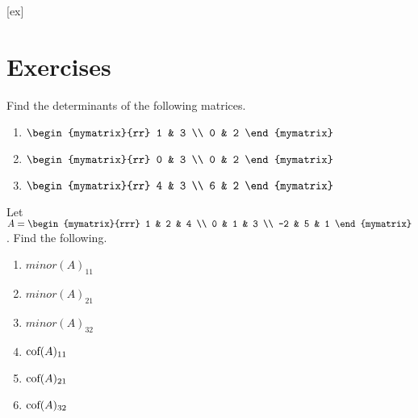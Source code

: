 [ex]
\section*{Exercises}

\begin{enumialphparenastyle}

\begin{ex} Find the determinants of the following matrices.

\begin{enumerate}
\item $\begin{mymatrix}{rr}
1 & 3 \\
0 & 2
\end{mymatrix}$

\item $\begin{mymatrix}{rr}
0 & 3 \\
0 & 2
\end{mymatrix}$

\item $\begin{mymatrix}{rr}
4 & 3 \\
6 & 2
\end{mymatrix}$
\end{enumerate}
\end{ex}

\begin{ex} Let $A = \begin{mymatrix}{rrr}
1 & 2 & 4 \\
0 & 1 & 3 \\
-2 & 5 & 1 
\end{mymatrix}$. Find the following.
\begin{enumerate}
\item $minor(A)_{11}$
\item $minor(A)_{21}$
\item $minor(A)_{32}$
\item $\mbox{\rm cof}(A)_{11}$
\item $\mbox{\rm cof}(A)_{21}$
\item $\mbox{\rm cof}(A)_{32}$
\end{enumerate}
\end{ex}


\end{enumialphparenastyle}
